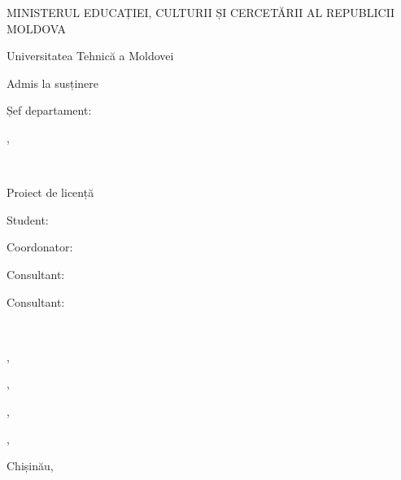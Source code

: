 




\begin{titlepage}

    {MINISTERUL EDUCAȚIEI, CULTURII ȘI CERCETĂRII AL REPUBLICII MOLDOVA \par}
    {Universitatea Tehnică a Moldovei \par}
    {\facultyname \par}
    {\departmentname \par}

	\vfill
	
	\hfill
	\begin{minipage}{0.35\textwidth}
	    \raggedleft
    	{\small Admis la susținere \par}
    	{\small Șef departament: \par}
    	{\small \chairmanname, \chairmantitle \par}
    	\bigskip
    	{\small \dotfill \par}
    	\medskip
    	{\small \dotfill\ \degreeyear \par}
    \end{minipage}
	
	\vfill
	
	{\LARGE \titlero \par}
	{\Large Proiect de licență \par}
	
	\vfill
	
	\hfill
    \begin{minipage}{0.25\textwidth}
        \raggedright
        {Student: \par}
        {Coordonator: \par}
        {Consultant: \par}
        {Consultant: \par}
    \end{minipage}
    ~
    \begin{minipage}{0.45\textwidth}
        \raggedleft
        {\authorname, \authorgroup \par}
        {\supername, \supertitle \par}
        {\consultantonename, \consultantonetitle \par}
        {\consultanttwoname, \consultanttwotitle \par}
    \end{minipage}
	
	\vfill

	{Chișinău, \degreeyear \par}

\end{titlepage}